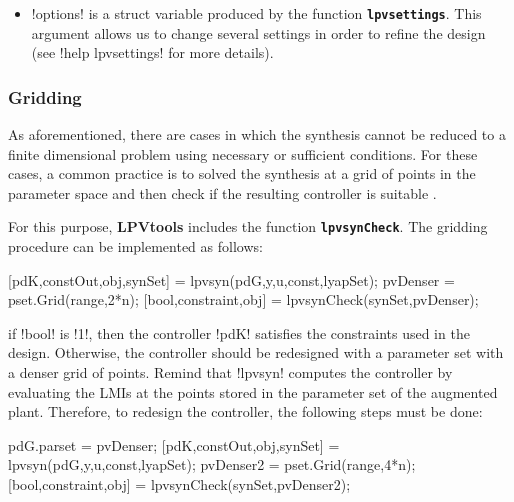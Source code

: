 \documentclass[fleqn,11pt]{article}
\newcommand{\lcode}[1]{\textbf{%
    \lstinline[style=mystyle]{#1}}}
\newcommand{\p}{\rho}
\newcommand{\Bu}{\mathbf{\hat B}}
\newcommand{\Cu}{\mathbf{\hat C}}
\newcommand{\Du}{\mathbf{\hat D}}
\newcommand{\lpvtool}{\textbf{LPVtools}\xspace}
\begin{document}
\begin{itemize}
\begin{itemize}
              \item !ctrlFcn.dk=0! can be used to force $D_c(\p)=0$.
              \item !ctrlFcn.pdIn!, taking values !0! or !1!, can be used to ensure the vertex property is satisfied in case the matrices $C_2$ and $D_{21}$ are parameter dependent. By setting !ctrlFcn.pdIn=0!, the auxiliary matrices $\Bu$ and $\Du$ are set as constant matrices. Thus, terms, like $\Bu C_2(\p)$, are affine functions of the parameters.
              \item !ctrlFcn.pdOut!, taking values !0! or !1!, is used to set $\Cu$ and $\Du$ as constant matrices in case that $B_2$ and $D_{12}$ are parameter dependent.

        \end{itemize}
    \item !options! is a struct variable produced by the function \lcode{lpvsettings}. This argument allows us to change several settings in order to refine the design (see !help lpvsettings! for more details).
\end{itemize}

\subsubsection{Gridding}\label{sssec:synGrid}

As aforementioned, there are cases in which the synthesis cannot be reduced to a finite dimensional problem using necessary or sufficient conditions. For these cases, a common practice is to solved the synthesis at a grid of points in the parameter space and then check if the resulting controller is suitable \cite{wu_induced_1996,apkarian_advanced_1998}.

For this purpose, \lpvtool includes the function \lcode{lpvsynCheck}. The gridding procedure can be implemented as follows:
\begin{code}
[pdK,constOut,obj,synSet] = lpvsyn(pdG,y,u,const,lyapSet);
pvDenser = pset.Grid(range,2*n);
[bool,constraint,obj] = lpvsynCheck(synSet,pvDenser);
\end{code}
if !bool! is !1!, then the controller !pdK! satisfies the constraints used in the design. Otherwise, the controller should be redesigned with a parameter set with a denser grid of points. Remind that !lpvsyn! computes the controller by evaluating the LMIs at the points stored in the parameter set of the augmented plant. Therefore, to redesign the controller, the following steps must be done:
\begin{code}
pdG.parset = pvDenser;
[pdK,constOut,obj,synSet] = lpvsyn(pdG,y,u,const,lyapSet);
pvDenser2 = pset.Grid(range,4*n);
[bool,constraint,obj] = lpvsynCheck(synSet,pvDenser2);
\end{code}
\end{document}
